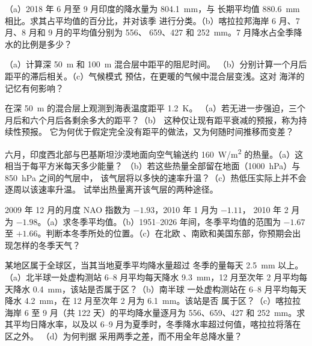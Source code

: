 \begin{exercise}[$\star$]\label{exo:b2:climate-variability:4}
（a）2018 年 6 月至 9 月印度的降水量为 \qty{804.1}{mm}，与
长期平均值 \qty{880.6}{mm} 相比。求其占平均值的百分比，并对该季
进行分类。（b）喀拉拉邦海岸 6 月、7 月、8 月和 9 月的平均值分别为 556、
659、427 和 \qty{252}{mm}。7 月降水占全季降水的比例是多少？
\end{exercise}

\begin{exercise}[$\star\star$]\label{exo:b2:climate-variability:5}
（a）计算深 \qty{50}{m} 和 \qty{100}{m} 混合层中距平的阻尼时间。
（b）分别计算一个月后距平的滞后相关。（c）气候模式
预估，在更暖的气候中混合层变浅。这对
海洋的记忆有何影响？
\end{exercise}

\begin{exercise}[$\star\star$]\label{exo:b2:climate-variability:6}
在深 \qty{50}{m} 的混合层上观测到海表温度距平 \qty{+1.2}{K}。
（a）若无进一步强迫，三个月后和六个月后各剩余多大的距平？（b）
这种仅让现有距平衰减的预报，称为持续性预报。
它为何优于假定完全没有距平的做法，又为何随时间推移而变差？
\end{exercise}

\begin{exercise}[$\star\star$]\label{exo:b2:climate-variability:7}
六月，印度西北部与巴基斯坦沙漠地面向空气输送约
\qty{160}{W/m^2} 的热量。（a）这相当于每平方米每天多少能量？
（b）若这些热量全部留在地面（\qty{1000}{hPa}）与 \qty{850}{hPa} 之间的气层中，
该气层将以多快的速率升温？（c）热低压实际上并不会逐周以该速率升温。
试举出热量离开该气层的两种途径。
\end{exercise}

\begin{exercise}[$\star\star$]\label{exo:b2:climate-variability:8}
2009 年 12 月的月度 NAO 指数为 $-1.93$，2010 年 1 月为 $-1.11$，
2010 年 2 月为 $-1.98$。（a）求冬季平均值。（b）1951--2026 年间，冬季平均值的范围为
$-1.67$ 至 $+1.66$。判断本冬季所处的位置。（c）在北欧
、南欧和美国东部，你预期会出现怎样的冬季天气？
\end{exercise}

\begin{exercise}[$\star\star$]\label{exo:b2:climate-variability:9}
某地区属于全球区，当其当地夏季平均降水量超过
冬季的量每天 \qty{2.5}{mm} 以上。（a）北半球一处虚构测站
6--8 月平均每天降水 \qty{9.3}{mm}，12 月至次年 2 月平均每天降水
\qty{0.4}{mm}，该站是否属于区？（b）南半球
一处虚构测站在 6--8 月平均每天降水 \qty{4.2}{mm}，在 12 月至次年 2 月为 \qty{6.1}{mm}。该站是否
属于区？（c）喀拉拉海岸 6 至 9 月（共 122 天）的平均降水量逐月为 556、659、427 和
\qty{252}{mm}。求其平均日降水率，以及以 6--9 月为夏季时，冬季降水率超过何值，喀拉拉将落在区之外。
（d）为何判据
采用两季之差，而不用全年总降水量？
\end{exercise}

